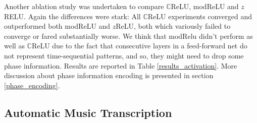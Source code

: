 \documentclass{article}
\begin{document}
Another ablation study was undertaken to compare $\mathbb{C}$ReLU, modReLU and $z$RELU. Again the differences were stark: All $\mathbb{C}$ReLU experiments converged and outperformed both modReLU and $z$ReLU, both which variously failed to converge or fared substantially worse. We think that modRelu didn't perform as well as $\mathbb{C}$ReLU due to the fact that consecutive layers in a feed-forward net do not represent time-sequential patterns, and so, they might need to drop some phase information. Results are reported in Table \ref{results_activation}. More discussion about phase information encoding is presented in section \ref{phase_encoding}.

\subsection{Automatic Music Transcription}
\label{sec:music_results}
\end{document}
